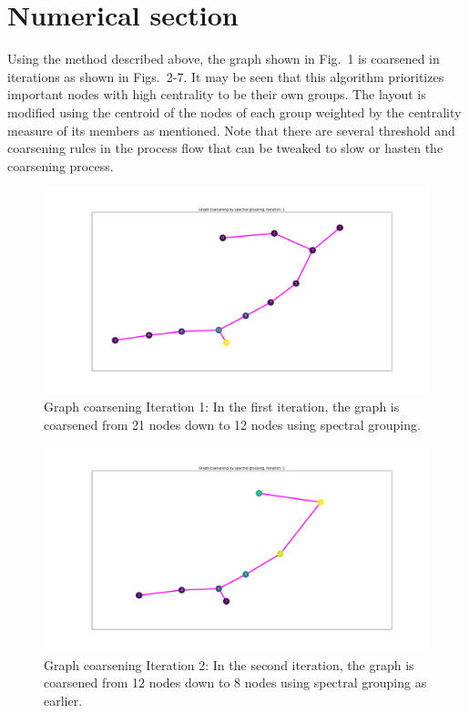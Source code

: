 \documentclass[11pt]{article}
\begin{document}
\section{Numerical section}
Using the method described above, the graph shown in Fig.~1 is coarsened in iterations as shown in Figs.~2-7. It may be seen that this algorithm prioritizes important nodes with high centrality to be their own groups. The layout is modified using the centroid of the nodes of each group weighted by the centrality measure of its members as mentioned. Note that there are several threshold and coarsening rules in the process flow that can be tweaked to slow or hasten the coarsening process. 

\begin{figure}[H]
\centering
\includegraphics[width=1\textwidth]{Figure_1.png}
\caption{Graph coarsening Iteration 1: In the first iteration, the graph is coarsened from 21 nodes down to 12 nodes using spectral grouping. \label{fig:Iteration1}}
\end{figure}

\begin{figure}[H]
\centering
\includegraphics[width=1\textwidth]{Figure_2.png}
\caption{Graph coarsening Iteration 2: In the second iteration, the graph is coarsened from 12 nodes down to 8 nodes using spectral grouping as earlier.\label{fig:Iteration2}}
\end{figure}
\end{document}
